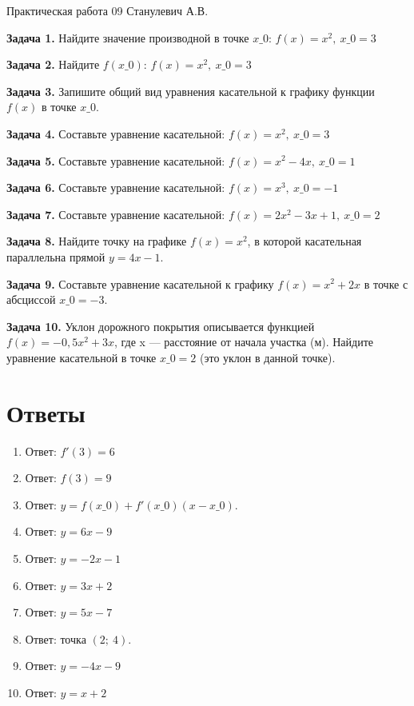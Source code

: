 \documentclass{umk-matematika}
\begin{document}
\maketitlepage
    {Практическая работа 09}
    {}
    {Станулевич А.В.}

\textbf{Задача 1.} Найдите значение производной в точке $x\_0$: $f(x) = x^2,\ x\_0 = 3$\par\vspace{10pt}
\textbf{Задача 2.} Найдите $f(x\_0)$: $f(x) = x^2,\ x\_0 = 3$\par\vspace{10pt}
\textbf{Задача 3.} Запишите общий вид уравнения касательной к графику функции $f(x)$ в точке $x\_0$.\par\vspace{10pt}
\textbf{Задача 4.} Составьте уравнение касательной: $f(x) = x^2,\ x\_0 = 3$\par\vspace{10pt}
\textbf{Задача 5.} Составьте уравнение касательной: $f(x) = x^2 - 4x,\ x\_0 = 1$\par\vspace{10pt}
\textbf{Задача 6.} Составьте уравнение касательной: $f(x) = x^3,\ x\_0 = -1$\par\vspace{10pt}
\textbf{Задача 7.} Составьте уравнение касательной: $f(x) = 2x^2 - 3x + 1,\ x\_0 = 2$\par\vspace{10pt}
\textbf{Задача 8.} Найдите точку на графике $f(x) = x^2$, в которой касательная параллельна прямой $y = 4x - 1$.\par\vspace{10pt}
\textbf{Задача 9.} Составьте уравнение касательной к графику $f(x) = x^2 + 2x$ в точке с абсциссой $x\_0 = -3$.\par\vspace{10pt}
\textbf{Задача 10.} Уклон дорожного покрытия описывается функцией $f(x) = -0{,}5x^2 + 3x$, где x — расстояние от начала участка (м). Найдите уравнение касательной в точке $x\_0 = 2$ (это уклон в данной точке).\par\vspace{10pt}
\newpage
\section*{Ответы}

\begin{enumerate}
  \item Ответ: $f'(3) = 6$
  \item Ответ: $f(3) = 9$
  \item Ответ: $y = f(x\_0) + f'(x\_0)(x - x\_0)$.
  \item Ответ: $y = 6x - 9$
  \item Ответ: $y = -2x - 1$
  \item Ответ: $y = 3x + 2$
  \item Ответ: $y = 5x - 7$
  \item Ответ: точка $(2;\ 4)$.
  \item Ответ: $y = -4x - 9$
  \item Ответ: $y = x + 2$
\end{enumerate}
\end{document}
